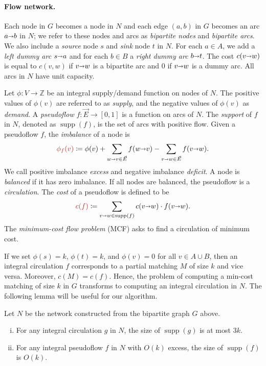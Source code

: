 \documentclass[11pt,twoside]{article}
\def\ints{\mathbb{Z}}
\def\Set#1{\left\{ #1 \right\}}
\def\fsupply{\phi}
\def\arcto{\mathord\shortrightarrow}
\def\arc#1#2{#1\arcto#2}
\def\cost{c}
\def\supp{\operatorname{supp}}
\theoremstyle{plain}
\numberwithin{figure}{section}
\renewcommand{\subparagraph}{\paragraph}
\def\EMPH#1{\textcolor{BrickRed}{{\emph{#1}}}}
\begin{document}
\subparagraph{Flow network.}
Each node in $G$ becomes a node in $N$ and each edge
$(a, b)$ in $G$ becomes an arc $\arc{a}{b}$ in $N$;
we refer to these nodes and arcs as \EMPH{bipartite nodes} and \EMPH{bipartite arcs}.
We also include a \EMPH{source} node $s$ and \EMPH{sink} node $t$ in $N$.
For each $a \in A$, we add a \EMPH{left dummy arc} $\arc{s}{a}$ and for each
$b \in B$ a \EMPH{right dummy arc} $\arc{b}{t}$.
The cost \EMPH{$c(\arc{v}{w})$}
is equal to $c(v, w)$ if
$\arc{v}{w}$ is a bipartite arc and $0$ if $\arc{v}{w}$ is a dummy arc.
All arcs in $N$ have unit capacity.

Let $\fsupply: V \to \ints$ be an integral supply/demand function on nodes of $N$.
The positive values of $\fsupply(v)$ are referred to as \EMPH{supply}, and the
negative values of $\fsupply(v)$ as \EMPH{demand}.
A \EMPH{pseudoflow} $f: \vec{E} \to [0, 1]$ is a function on arcs of $N$.
The \EMPH{support} of $f$ in $N$, denoted as \EMPH{$\supp(f)$}, is the set of arcs with positive flow.
Given a pseudoflow $f$, the \EMPH{imbalance} of a node is
\[
\EMPH{$\fsupply_f (v)$} \coloneqq \fsupply(v) + \sum_{\arc wv \in \vec{E}}{f(\arc wv)} - \sum_{\arc vw \in \vec{E}}{f(\arc vw)}.
\]
We call positive imbalance \EMPH{excess} and negative imbalance \EMPH{deficit}.
A node is \EMPH{balanced} if it has zero imbalance.
If all nodes are balanced, the pseudoflow is a \EMPH{circulation}.
The \EMPH{cost} of a pseudoflow is defined to be
\[
 \EMPH{$\cost(f)$} \coloneqq \sum_{\arc vw \in \supp(f)} c(\arc vw) \cdot f(\arc vw).
\]
The \EMPH{minimum-cost flow problem} (MCF) asks to find a circulation of minimum cost.

If we set $\fsupply(s) = k$, $\fsupply(t) = k$, and $\fsupply(v) = 0$ for all
$v \in A \cup B$, then an integral circulation $f$ corresponds to a partial
matching $M$ of size $k$ and vice versa.
Moreover, $\cost(M) = \cost(f)$.
%
Hence, the problem of computing a min-cost matching of size $k$ in $G$
transforms to computing an integral circulation in $N$.
The following lemma will be useful for our algorithm.

\begin{lemma}
\label{lemma:supp_size}
Let $N$ be the network constructed from the bipartite graph $G$ above.
\begin{enumerate}[(i)]
\item For any integral circulation $g$ in $N$, the size of $\supp(g)$ is at most $3k$.
\item For any integral pseudoflow $f$ in $N$ with $O(k)$ excess, the size of $\supp(f)$ is $O(k)$.
\end{enumerate}
\end{lemma}
\end{document}
